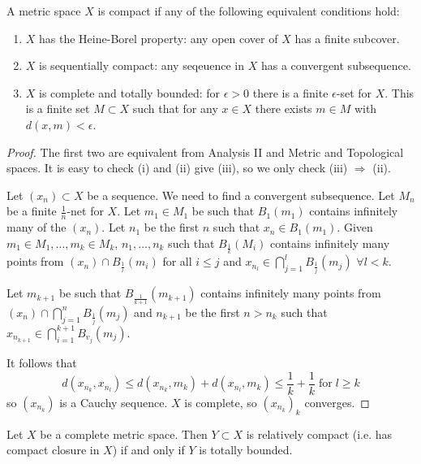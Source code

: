\documentclass{article}
\begin{document}
\begin{prop}
    A metric space $X$ is compact if any of the following equivalent conditions hold:
    \begin{enumerate}[label=(\roman*)]
        \item $X$ has the Heine-Borel property: any open cover of $X$ has a finite subcover.
        \item $X$ is sequentially compact: any seqeuence in $X$ has a convergent subsequence.
        \item $X$ is complete and totally bounded: for $\epsilon > 0$ there is a finite $\epsilon$-set for $X$. This is a finite set $M \subset X$ such that for any $x \in X$ there exists $m \in M$ with $d(x, m) < \epsilon$.
    \end{enumerate}
\end{prop}


\begin{proof}
    The first two are equivalent from Analysis II and Metric and Topological spaces. It is easy to check (i) and (ii) give (iii), so we only check (iii) $\Rightarrow$ (ii).

    Let $(x_n) \subset X$ be a sequence. We need to find a convergent subsequence. Let $M_n$ be a finite $\frac{1}{n}$-net for $X$.
    Let $m_1 \in M_1$ be such that $B_1(m_1)$ contains infinitely many of the $(x_n)$. Let $n_1$ be the first $n$ such that $x_n \in B_1(m_1)$.
    Given $m_1 \in M_1, \dotsc, m_k \in M_k$, $n_1, \dotsc, n_k$ such that $B_\frac{1}{k}(M_i)$ contains infinitely many points from $(x_n) \cap B_\frac{1}{i}(m_i)$ for all $i \leq j$ and $x_{n_l} \in \bigcap_{j=1}^l B_\frac{1}{j}(m_j)$ $\forall l < k$.

    Let $m_{k+1}$ be such that $B_\frac{1}{k+1}(m_{k+1})$ contains infinitely many points from $(x_n) \cap \bigcap_{j=1}^n B_\frac{1}{j} (m_j)$ and $n_{k+1}$ be the first $n > n_k$ such that $x_{n_{k+1}} \in \bigcap_{i=1}^{k+1} B_{v_j} (m_j)$.

    It follows that
    \begin{equation*}
        d(x_{n_k}, x_{n_l}) \leq d(x_{n_k}, m_k) + d(x_{n_l}, m_k) \leq \frac{1}{k} + \frac{1}{k} \; \text{for} \; l \geq k
    \end{equation*}
    so $(x_{n_k})$ is a Cauchy sequence. $X$ is complete, so $(x_{n_k})_k$ converges.
\end{proof}

\begin{cor}
    Let $X$ be a complete metric space. Then $Y \subset X$ is relatively compact (i.e. has compact closure in $X$) if and only if $Y$ is totally bounded.
\end{cor}
\end{document}
